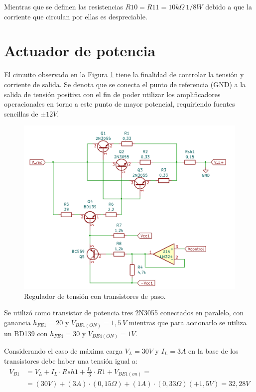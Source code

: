 Mientras que se definen las resistencias $R10=R11=10 k\Omega \ 1/8W$ debido a que la corriente que circulan por ellas es despreciable.\par 

\section{Actuador de potencia} \par 

El circuito observado en la Figura \ref{F:Circuito_Actuador} tiene la finalidad de controlar la tensión y corriente de salida. Se denota que se conecta el punto de referencia (GND) a la salida de tensión positiva con el fin de poder utilizar los amplificadores operacionales en torno a este punto de mayor potencial, requiriendo fuentes sencillas de $\pm12V$.

\begin{figure} [H]
	\centering
	\includegraphics[width=\textwidth]{./imagenes/Circuito_actuador.png}
	\caption{Regulador de tensión con transistores de paso.}
	\label{F:Circuito_Actuador}
\end{figure} \par 

Se utilizó como transistor de potencia tres 2N3055 conectados en paralelo, con ganancia $h_{FE1} =20$ y $V_{BE1(ON)} =1,5~V$ mientras que para accionarlo se utiliza un BD139 con $h_{FE4} =30$ y $V_{BE4(ON)} =1V$. \par 
Considerando el caso de máxima carga $V_L =30V$ y $I_L =3A$ en la base de los transistores debe haber una tensión igual a:
\begin{equation}
\begin{split}
V_{B1}&=V_L+I_L\cdot Rsh1+\frac{I_L}{3}\cdot R1+V_{BE1(on)}= \\
&=(30V)+(3A)\cdot (0,15\Omega)+(1A)\cdot (0,33\Omega)(+1,5V)=32,28V
\end{split}
\end{equation} \par 

